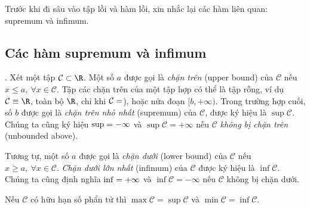 Trước khi đi sâu vào tập lồi và hàm lồi, xin nhắc lại các hàm liên quan: supremum và infimum. 

\subsection{Các hàm supremum và infimum}

.
\def\CC{\mathcal{C}}
Xét một tập $\mathcal{C} \subset \R$. Một số $a$ được gọi là \textit{chặn trên} (upper bound) của $\CC$ nếu   $x \leq a, ~ \forall x \in \CC$. Tập các chặn trên của một tập hợp có thể là tập rỗng, ví dụ $\CC \equiv \R$, toàn bộ $\R$, chỉ khi $\CC = \empty$), hoặc nửa đoạn $[b, +\infty)$. Trong trường hợp cuối, số $b$ được gọi là \textit{chặn trên nhỏ nhất} (supremum) của $\CC$, được ký hiệu là $\sup \CC$. Chúng ta cũng ký hiệu $\sup \empty = -\infty$ và $\sup \CC = +\infty$ nếu $\CC$ \textit{không bị chặn trên} (unbounded above). 

Tương tự, một số $a$ được gọi là \textit{chặn dưới} (lower bound) của $\CC$ nếu $x \geq a, ~\forall x \in \CC$. \textit{Chặn dưới lớn nhất} (infimum) của $\CC$ được ký hiệu là $\inf \CC$. Chúng ta cũng định nghĩa $\inf \empty = +\infty$ và $\inf \CC  = -\infty$ nếu $\CC$ không bị chặn dưới. 

Nếu $\CC$ có hữu hạn số phẩn tử thì $\max \CC = \sup \CC$ và $\min \CC = \inf \CC$.

